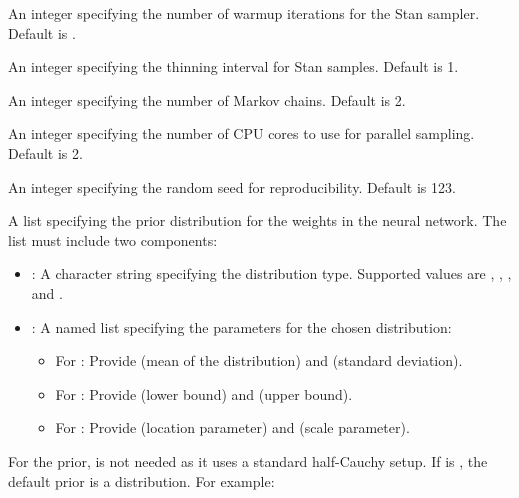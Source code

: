\documentclass[a4paper]{book}
\begin{document}
\begin{Arguments}
\begin{ldescription}
\item[\code{warmup}] An integer specifying the number of warmup iterations for the Stan sampler. Default is .

\item[\code{thin}] An integer specifying the thinning interval for Stan samples. Default is 1.

\item[\code{chains}] An integer specifying the number of Markov chains. Default is 2.

\item[\code{cores}] An integer specifying the number of CPU cores to use for parallel sampling. Default is 2.

\item[\code{seed}] An integer specifying the random seed for reproducibility. Default is 123.

\item[\code{prior\_weights}] A list specifying the prior distribution for the weights in the neural network.
The list must include two components:
\begin{itemize}

\item{} : A character string specifying the distribution type. Supported values are
, , , and .
\item{} : A named list specifying the parameters for the chosen distribution:
\begin{itemize}

\item{} For : Provide  (mean of the distribution) and  (standard deviation).
\item{} For : Provide  (lower bound) and  (upper bound).
\item{} For : Provide  (location parameter) and  (scale parameter).

\end{itemize}


\end{itemize}

For the  prior,  is not needed as it uses a standard half-Cauchy setup.
If  is , the default prior is a  distribution.
For example:
\begin{itemize}


\end{itemize}
\end{ldescription}
\end{Arguments}
\end{document}
